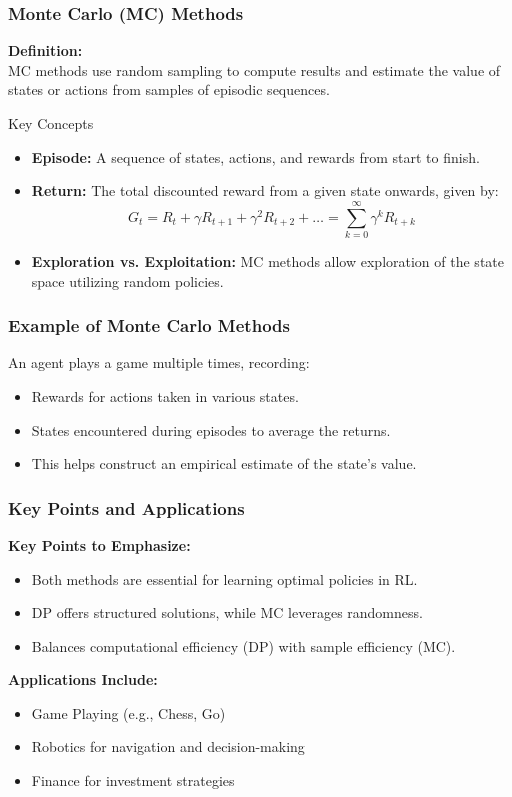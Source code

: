 \documentclass[aspectratio=169]{beamer}
\begin{document}
\begin{frame}[fragile]
    \frametitle{Monte Carlo (MC) Methods}
    
    \textbf{Definition:} \\
    MC methods use random sampling to compute results and estimate the value of states or actions from samples of episodic sequences.

    \begin{block}{Key Concepts}
        \begin{itemize}
            \item \textbf{Episode:} A sequence of states, actions, and rewards from start to finish.
            \item \textbf{Return:} The total discounted reward from a given state onwards, given by:
            \begin{equation}
                G_t = R_t + \gamma R_{t+1} + \gamma^2 R_{t+2} + \ldots = \sum_{k=0}^\infty \gamma^k R_{t+k}
            \end{equation}
            \item \textbf{Exploration vs. Exploitation:} MC methods allow exploration of the state space utilizing random policies.
        \end{itemize}
    \end{block}
\end{frame}

\begin{frame}[fragile]
    \frametitle{Example of Monte Carlo Methods}
    An agent plays a game multiple times, recording:
    \begin{itemize}
        \item Rewards for actions taken in various states.
        \item States encountered during episodes to average the returns.
        \item This helps construct an empirical estimate of the state’s value.
    \end{itemize}
\end{frame}

\begin{frame}[fragile]
    \frametitle{Key Points and Applications}
    \textbf{Key Points to Emphasize:}
    \begin{itemize}
        \item Both methods are essential for learning optimal policies in RL.
        \item DP offers structured solutions, while MC leverages randomness.
        \item Balances computational efficiency (DP) with sample efficiency (MC).
    \end{itemize}

    \textbf{Applications Include:}
    \begin{itemize}
        \item Game Playing (e.g., Chess, Go)
        \item Robotics for navigation and decision-making
        \item Finance for investment strategies
    \end{itemize}
\end{frame}
\end{document}
